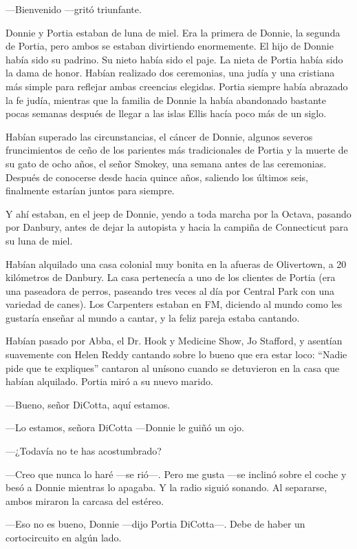 ---Bienvenido ---gritó triunfante.

Donnie y Portia estaban de luna de miel. Era la primera de Donnie, la
segunda de Portia, pero ambos se estaban divirtiendo enormemente. El
hijo de Donnie había sido su padrino. Su nieto había sido el paje. La
nieta de Portia había sido la dama de honor. Habían realizado dos
ceremonias, una judía y una cristiana más simple para reflejar ambas
creencias elegidas. Portia siempre había abrazado la fe judía, mientras
que la familia de Donnie la había abandonado bastante pocas semanas
después de llegar a las islas Ellis hacía poco más de un siglo.

Habían superado las circunstancias, el cáncer de Donnie, algunos severos
fruncimientos de ceño de los parientes más tradicionales de Portia y la
muerte de su gato de ocho años, el señor Smokey, una semana antes de las
ceremonias. Después de conocerse desde hacia quince años, saliendo los
últimos seis, finalmente estarían juntos para siempre.

Y ahí estaban, en el jeep de Donnie, yendo a toda marcha por la Octava,
pasando por Danbury, antes de dejar la autopista y hacia la campiña de
Connecticut para su luna de miel.

Habían alquilado una casa colonial muy bonita en la afueras de
Olivertown, a 20 kilómetros de Danbury. La casa pertenecía a uno de los
clientes de Portia (era una paseadora de perros, paseando tres veces al
día por Central Park con una variedad de canes). Los Carpenters estaban
en FM, diciendo al mundo como les gustaría enseñar al mundo a cantar, y
la feliz pareja estaba cantando.

Habían pasado por Abba, el Dr. Hook y Medicine Show, Jo Stafford, y
asentían suavemente con Helen Reddy cantando sobre lo bueno que era
estar loco: ``Nadie pide que te expliques'' cantaron al unísono cuando
se detuvieron en la casa que habían alquilado. Portia miró a su nuevo
marido.

---Bueno, señor DiCotta, aquí estamos.

---Lo estamos, señora DiCotta ---Donnie le guiñó un ojo.

---¿Todavía no te has acostumbrado?

---Creo que nunca lo haré ---se rió---. Pero me gusta ---se inclinó
sobre el coche y besó a Donnie mientras lo apagaba. Y la radio siguió
sonando. Al separarse, ambos miraron la carcasa del estéreo.

---Eso no es bueno, Donnie ---dijo Portia DiCotta---. Debe de haber un
cortocircuito en algún lado.

